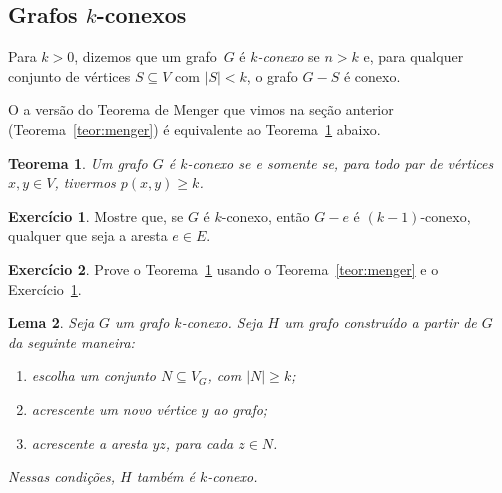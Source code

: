 \documentclass[12pt, a4paper]{article}
\newtheorem{teor}{Teorema}[section]
\newtheorem{lema}[teor]{Lema}
\theoremstyle{definition}
\newtheorem{exer}{Exercício}
\begin{document}


\subsection {Grafos $k$-conexos}

Para $k > 0$, dizemos que um grafo~$G$ é \emph{$k$-conexo} se $n > k$
e, para qualquer conjunto de vértices $S \subseteq V$ com $|S| < k$, o
grafo $G - S$ é conexo.

O a versão do Teorema de Menger que vimos na seção anterior
(Teorema~\ref{teor:menger}) é equivalente ao
Teorema~\ref{teor:menger2} abaixo.

\begin{teor}
  \label{teor:menger2}
  Um grafo $G$ é $k$-conexo se e somente se, para todo par de vértices
  $x,y \in V$, tivermos $p(x,y) \geq k$.
\end{teor}

\begin{exer}
  \label{exer:G_minus_e_connected}
  Mostre que, se $G$ é $k$-conexo, então $G - e$ é $(k-1)$-conexo,
  qualquer que seja a aresta $e \in E$.
\end{exer}

\begin{exer}
  Prove o Teorema~\ref{teor:menger2} usando o
  Teorema~\ref{teor:menger} e o
  Exercício~\ref{exer:G_minus_e_connected}.
\end{exer}

\begin{lema}
  \label{lema:still_k_connected}
  Seja $G$ um grafo $k$-conexo. Seja $H$ um grafo construído a partir de $G$ da seguinte maneira:
  \begin{enumerate}
  \item escolha um conjunto $N \subseteq V_G$, com $|N| \geq k$;
  \item acrescente um novo vértice $y$ ao grafo;
  \item acrescente a aresta $yz$, para cada $z \in N$.
  \end{enumerate}
  Nessas condições, $H$ também é $k$-conexo.
\end{lema}
\end{document}
